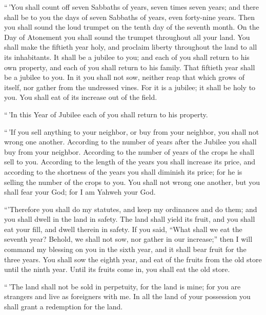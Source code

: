  ``\,'You shall count off seven Sabbaths of years, seven
times seven years; and there shall be to you the days of seven Sabbaths
of years, even forty-nine years.  Then you shall sound the
loud trumpet on the tenth day of the seventh month. On the Day of
Atonement you shall sound the trumpet throughout all your land.
 You shall make the fiftieth year holy, and proclaim
liberty throughout the land to all its inhabitants. It shall be a
jubilee to you; and each of you shall return to his own property, and
each of you shall return to his family.  That fiftieth
year shall be a jubilee to you. In it you shall not sow, neither reap
that which grows of itself, nor gather from the undressed vines.
 For it is a jubilee; it shall be holy to you. You shall
eat of its increase out of the field.

 ``\,'In this Year of Jubilee each of you shall return to
his property.

 ``\,'If you sell anything to your neighbor, or buy from
your neighbor, you shall not wrong one another. 
According to the number of years after the Jubilee you shall buy from
your neighbor. According to the number of years of the crops he shall
sell to you.  According to the length of the years you
shall increase its price, and according to the shortness of the years
you shall diminish its price; for he is selling the number of the crops
to you.  You shall not wrong one another, but you shall
fear your God; for I am Yahweh your God.

 ``'Therefore you shall do my statutes, and keep my
ordinances and do them; and you shall dwell in the land in safety.
 The land shall yield its fruit, and you shall eat your
fill, and dwell therein in safety.  If you said, ``What
shall we eat the seventh year? Behold, we shall not sow, nor gather in
our increase;''  then I will command my blessing on you
in the sixth year, and it shall bear fruit for the three years.
 You shall sow the eighth year, and eat of the fruits
from the old store until the ninth year. Until its fruits come in, you
shall eat the old store.

 ``\,'The land shall not be sold in perpetuity, for the
land is mine; for you are strangers and live as foreigners with me.
 In all the land of your possession you shall grant a
redemption for the land.

